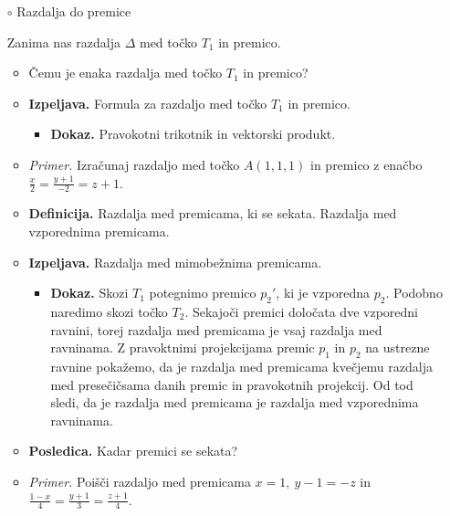 \begin{enumerate}
    \item[$\circ$] Razdalja do premice
    
    Zanima nas razdalja $\Delta$ med točko $T_1$ in premico.
    \begin{itemize}
        \item Čemu je enaka razdalja med točko $T_1$ in premico?
        \item \colorbox{blue!30}{\textbf{Izpeljava.}} Formula za razdaljo med točko $T_1$ in premico.
        \begin{itemize}
            \item \colorbox{green!30}{\textbf{Dokaz.}} Pravokotni trikotnik in vektorski produkt.
        \end{itemize}
        \item \colorbox{yellow!30}{\emph{Primer.}} Izračunaj razdaljo med točko $A(1,1,1)$ in premico z enačbo $\frac{x}{2} = \frac{y+1}{-2}=z+1$.
        \item \colorbox{purple!30}{\textbf{Definicija.}} Razdalja med premicama, ki se sekata. Razdalja med vzporednima premicama.
        \item \colorbox{blue!30}{\textbf{Izpeljava.}} Razdalja med mimobežnima premicama.
        \begin{itemize}
            \item \colorbox{green!30}{\textbf{Dokaz.}} Skozi $T_1$ potegnimo premico $p_2'$, ki je vzporedna $p_2$. Podobno naredimo skozi točko $T_2$. Sekajoči premici določata dve vzporedni ravnini, torej razdalja med premicama je vsaj razdalja med ravninama. Z pravoktnimi projekcijama premic $p_1$ in $p_2$ na ustrezne ravnine pokažemo, da je razdalja med premicama kvečjemu razdalja med presečičsama danih premic in pravokotnih projekcij. Od tod sledi, da je razdalja med premicama je razdalja med vzporednima ravninama.
        \end{itemize}
        \item \colorbox{orange!30}{\textbf{Posledica.}} Kadar premici se sekata?
        \item \colorbox{yellow!30}{\emph{Primer.}} Poišči razdaljo med premicama $x=1, \ y-1 = - z$ in $\frac{1-x}{4}=\frac{y+1}{3}= \frac{z+1}{4}$.
    \end{itemize}
\end{enumerate}

\newpage
\